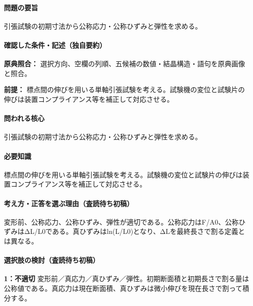 \paragraph{問題の要旨} 引張試験の初期寸法から公称応力・公称ひずみと弾性を求める。

\paragraph{確認した条件・記述（独自要約）}\mbox{}\par

\noindent\textbf{原典照合：} 選択方向、空欄の列順、五候補の数値・結晶構造・語句を原典画像と照合。\par

\noindent\textbf{前提：} 標点間の伸びを用いる単軸引張試験を考える。試験機の変位と試験片の伸びは装置コンプライアンス等を補正して対応させる。\par

\paragraph{問われる核心} 引張試験の初期寸法から公称応力・公称ひずみと弾性を求める。

\paragraph{必要知識} 標点間の伸びを用いる単軸引張試験を考える。試験機の変位と試験片の伸びは装置コンプライアンス等を補正して対応させる。

\paragraph{考え方・正答を選ぶ理由（査読待ち初稿）} 変形前、公称応力、公称ひずみ、弾性が適切である。公称応力はF/A0、公称ひずみはΔL/L0である。真ひずみはln(L/L0)となり、ΔLを最終長さで割る定義とは異なる。

\paragraph{選択肢の検討（査読待ち初稿）}\mbox{}\par

\noindent\textbf{1：不適切} 変形前／真応力／真ひずみ／弾性。初期断面積と初期長さで割る量は公称値である。真応力は現在断面積、真ひずみは微小伸びを現在長さで割って積分する。\par

